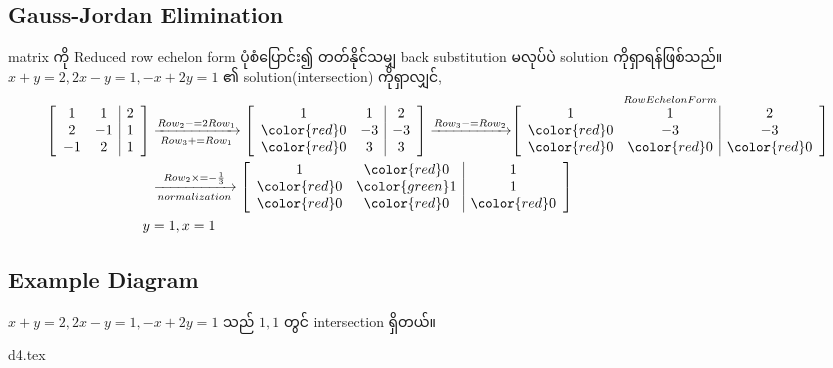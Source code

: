 \subsection{Gauss-Jordan Elimination}
matrix ကို Reduced row echelon form ပုံစံပြောင်း၍ တတ်နိုင်သမျှ back substitution မလုပ်ပဲ solution ကိုရှာရန်ဖြစ်သည်။
$x+y=2, 2x-y=1, -x+2y=1$ ၏ solution(intersection) ကိုရှာလျှင်, 
\[
    \begin{split}
        \left[\begin{array}{c c | c}
            1 & 1 & 2 \\
            2 & -1 & 1 \\
            -1 & 2 & 1
        \end{array}\right]&\xrightarrow[Row_3+=Row_1]{Row_2-=2Row_1}\left[\begin{array}{c c | c}
            1 & 1 & 2 \\
            {\color{red}0} & -3 & -3 \\
            {\color{red}0} & 3 & 3
        \end{array}\right]\xrightarrow{Row_3-=Row_2}\stackrel{Row EchelonForm}{\left[\begin{array}{c c | c}
            1 & 1 & 2 \\
            {\color{red}0} & -3 & -3 \\
            {\color{red}0} & {\color{red}0} & {\color{red}0}
        \end{array}\right]} \\
        &\xrightarrow[normalization]{Row_2\times=-\frac{1}{3}}\left[\begin{array}{c c | c}
            1 & {\color{red}0} & 1 \\
            {\color{red}0} & {\color{green} 1} & 1 \\
            {\color{red}0} & {\color{red}0} & {\color{red}0}
        \end{array}\right] \\
        y&=1,x=1 \\
    \end{split}
\]
\subsection*{Example Diagram}
$x+y=2, 2x-y=1, -x+2y=1$ သည် $1,1$ တွင် intersection ရှိတယ်။
\begin{center}
    {d4.tex}
\end{center} 